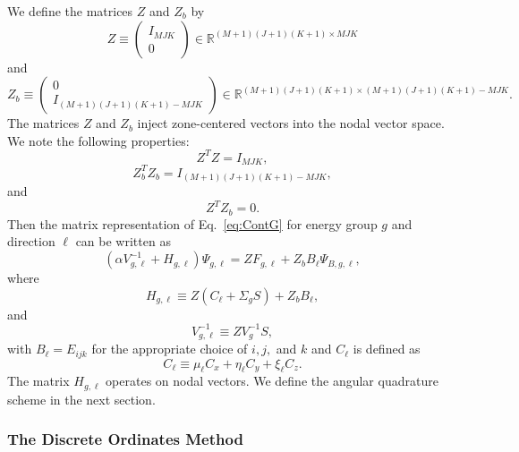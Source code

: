 We define the matrices $Z$ and $Z_{b}$ by
\begin{equation}
	Z \equiv \begin{pmatrix}
				I_{MJK} \\
				0
		      \end{pmatrix} \in \mathbb{R}^{(M+1)(J+1)(K+1) \times MJK}
\end{equation}
and
\begin{equation}
	Z_{b} \equiv \begin{pmatrix}
				0 \\
				I_{(M+1)(J+1)(K+1) - MJK}
		      \end{pmatrix} \in \mathbb{R}^{(M+1)(J+1)(K+1) \times (M+1)(J+1)(K+1) - MJK}.
\end{equation}
The matrices $Z$ and $Z_{b}$ inject zone-centered vectors into the nodal vector space. We note the following properties:
\begin{equation}
	Z^{T} Z = I_{MJK},
\end{equation}
\begin{equation}
	Z_{b}^{T} Z_{b} = I_{(M+1)(J+1)(K+1) - MJK},
\end{equation}
and
\begin{equation}
	Z^{T} Z_{b} = 0.
\end{equation}
Then the matrix representation of Eq.~\ref{eq:ContG} for energy group $g$ and direction $\ell$ can be written as
\begin{equation}
	(\alpha V^{-1}_{g,\ell} + H_{g,\ell}) \Psi_{g,\ell} = Z F_{g,\ell} + Z_{b} B_{\ell} \Psi_{B,g,\ell},
\end{equation}
where
\begin{equation}
	H_{g,\ell} \equiv Z(C_{\ell} + \Sigma_{g} S) + Z_{b} B_{\ell},
\end{equation}
and
\begin{equation}
	V^{-1}_{g,\ell} \equiv Z V^{-1}_{g} S,
\end{equation}
with $B_{\ell} = E_{ijk}$ for the appropriate choice of $i, j,$ and $k$ and $C_{\ell}$ is defined as
\begin{equation}
	C_{\ell} \equiv \mu_{\ell} C_{x} + \eta_{\ell} C_{y} + \xi_{\ell} C_{z}.
\end{equation}
The matrix $H_{g,\ell}$ operates on nodal vectors. We define the angular quadrature scheme in the next section.

\subsubsection{The Discrete Ordinates Method}

